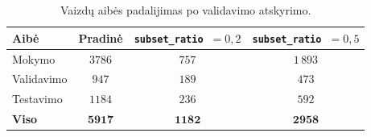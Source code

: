 \begin{table}[H]
    \centering
    \caption{Vaizdų aibės padalijimas po validavimo atskyrimo.}
    \begin{tabular}{|l|c|c|c|}
        \hline
        Aibė & Pradinė & \texttt{subset\_ratio}~$=0{,}2$ & \texttt{subset\_ratio}~$=0{,}5$ \\
        \hline
        Mokymo & $3786$ & $757$ & $1\,893$ \\ \hline
        Validavimo & $947$ & $189$ & $473$ \\ \hline
        Testavimo & $1184$ & $236$ & $592$ \\ \hline
        \textbf{Viso} & $\mathbf{5917}$ & $\mathbf{1182}$ & $\mathbf{2958}$ \\ \hline
    \end{tabular}
    \label{tab:image_split}
\end{table}
